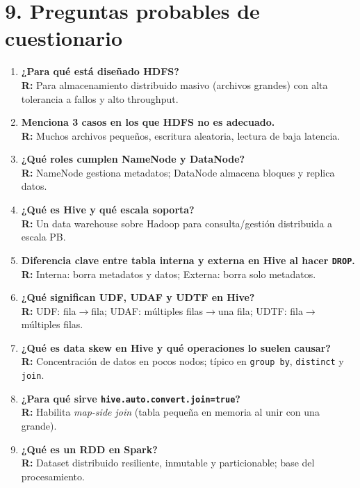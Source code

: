 \documentclass[8pt,a4paper,twocolumn]{article}
\begin{document}
\section{9. Preguntas probables de cuestionario}
\begin{enumerate}
\item \textbf{¿Para qué está diseñado HDFS?}\\
\textbf{R:} Para almacenamiento distribuido masivo (archivos grandes) con alta tolerancia a fallos y alto throughput.

\item \textbf{Menciona 3 casos en los que HDFS no es adecuado.}\\
\textbf{R:} Muchos archivos pequeños, escritura aleatoria, lectura de baja latencia.

\item \textbf{¿Qué roles cumplen NameNode y DataNode?}\\
\textbf{R:} NameNode gestiona metadatos; DataNode almacena bloques y replica datos.

\item \textbf{¿Qué es Hive y qué escala soporta?}\\
\textbf{R:} Un data warehouse sobre Hadoop para consulta/gestión distribuida a escala PB.

\item \textbf{Diferencia clave entre tabla interna y externa en Hive al hacer \texttt{DROP}.}\\
\textbf{R:} Interna: borra metadatos y datos; Externa: borra solo metadatos.

\item \textbf{¿Qué significan UDF, UDAF y UDTF en Hive?}\\
\textbf{R:} UDF: fila$\rightarrow$fila; UDAF: múltiples filas$\rightarrow$una fila; UDTF: fila$\rightarrow$múltiples filas.

\item \textbf{¿Qué es data skew en Hive y qué operaciones lo suelen causar?}\\
\textbf{R:} Concentración de datos en pocos nodos; típico en \texttt{group by}, \texttt{distinct} y \texttt{join}.

\item \textbf{¿Para qué sirve \texttt{hive.auto.convert.join=true}?}\\
\textbf{R:} Habilita \textit{map-side join} (tabla pequeña en memoria al unir con una grande).

\item \textbf{¿Qué es un RDD en Spark?}\\
\textbf{R:} Dataset distribuido resiliente, inmutable y particionable; base del procesamiento.


\end{enumerate}
\end{document}
